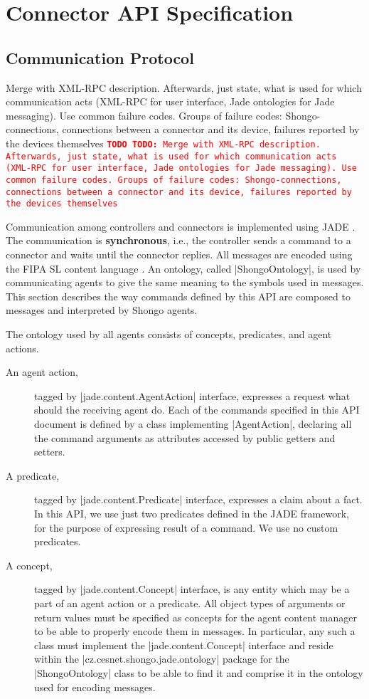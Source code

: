 \documentclass[a4paper]{report}
\newcommand{\TODO}[1]{%
\def\empty{}%
\def\prvniparametr{#1}%
\ifx\prvniparametr\empty%
\begingroup\tt\textcolor{red}{\noindent\textbf{TODO}}\endgroup
\else%
\begingroup\tt\textcolor{red}{\noindent\textbf{TODO:}\ #1}\endgroup
\fi%
}
\begin{document}
\chapter{Connector API Specification}

\section{Communication Protocol}

\TODO{Merge with XML-RPC description. Afterwards, just state, what is used for which communication acts (XML-RPC for user interface, Jade ontologies for Jade messaging). Use common failure codes. Groups of failure codes: Shongo-connections, connections between a connector and its device, failures reported by the devices themselves}

Communication among controllers and connectors is implemented using JADE \cite{jade}. The communication is \textbf{synchronous}, i.e., the controller sends a command to a connector and waits until the connector replies. All messages are encoded using the FIPA SL content language \cite{FIPA-SL}. An ontology, called |ShongoOntology|, is used by communicating agents to give the same meaning to the symbols used in messages. This section describes the way commands defined by this API are composed to messages and interpreted by Shongo agents.

The ontology used by all agents consists of concepts, predicates, and agent actions.
\begin{description}
\item[An agent action,] tagged by |jade.content.AgentAction| interface, expresses a request what should the receiving agent do. Each of the commands specified in this API document is defined by a class implementing |AgentAction|, declaring all the command arguments as attributes accessed by public getters and setters.
\item[A predicate,] tagged by |jade.content.Predicate| interface, expresses a claim about a fact. In this API, we use just two predicates defined in the JADE framework, for the purpose of expressing result of a command. We use no custom predicates.
\item[A concept,] tagged by |jade.content.Concept| interface, is any entity which may be a part of an agent action or a predicate. All object types of arguments or return values must be specified as concepts for the agent content manager to be able to properly encode them in messages. In particular, any such a class must implement the |jade.content.Concept| interface and reside within the |cz.cesnet.shongo.jade.ontology| package for the |ShongoOntology| class to be able to find it and comprise it in the ontology used for encoding messages.
\end{description}
\end{document}
